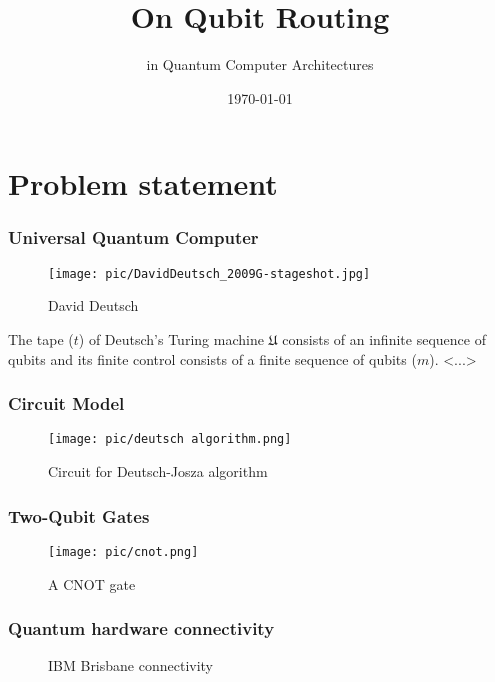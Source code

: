 \documentclass[lualatex,compress,12pt]{beamer}
\title{On Qubit Routing}
\subtitle{in Quantum Computer Architectures}
\date{\today}
\author{ M. Sobolev
	\\ {\small Supervised by: L. Laneve \and W. Schober  \and Prof. S. Wolf}}
\institute{USI}
\begin{document}
	
	\frame[plain]{\titlepage}

	


	

\section{Problem statement}
\begin{frame}
	\frametitle{Universal Quantum Computer}
	
	\begin{figure}
		\texttt{[image: pic/DavidDeutsch\_2009G-stageshot.jpg]}
		\caption{David Deutsch}
	\end{figure}
	
	\begin{definition}
		 The tape (\(t\)) of Deutsch’s Turing machine \(\mathfrak{U}\) consists of an infinite sequence of qubits and its finite control consists of a finite sequence of qubits (\(m\)). <...> \parencite{gruskaQuantumComputing2000} 
	\end{definition}
	


\end{frame}


\begin{frame}
	\frametitle{Circuit Model}
	
		\begin{figure}
		\texttt{[image: pic/deutsch algorithm.png]}
		\caption{Circuit for Deutsch-Josza algorithm \parencite{nielsenQuantumComputationQuantum2010}}
	\end{figure}
\end{frame}


\begin{frame}
	\frametitle{Two-Qubit Gates}
	
		\begin{figure}
		\texttt{[image: pic/cnot.png]}
		\caption{A CNOT gate \parencite{nielsenQuantumComputationQuantum2010}}
	\end{figure}
	
\end{frame}

\begin{frame}
	\frametitle{Quantum hardware connectivity}
	
	\begin{figure}
		
		\caption{IBM  Brisbane connectivity \parencite{IBMQuantumHeavy}}
	\end{figure}
	
\end{frame}
\end{document}
